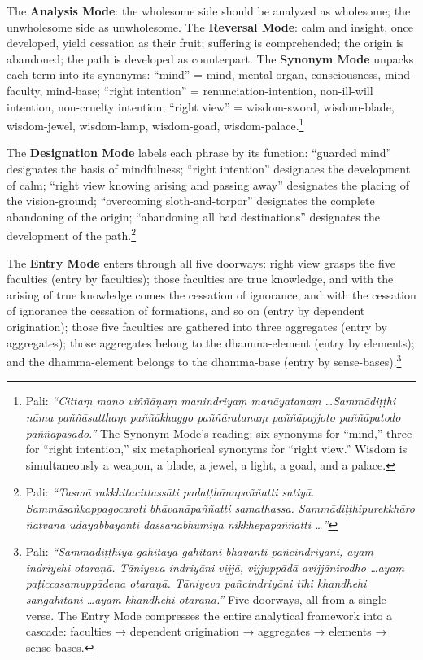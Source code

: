 The \textbf{Analysis Mode}: the wholesome side should be analyzed as wholesome; the unwholesome side as unwholesome. The \textbf{Reversal Mode}: calm and insight, once developed, yield cessation as their fruit; suffering is comprehended; the origin is abandoned; the path is developed as counterpart. The \textbf{Synonym Mode} unpacks each term into its synonyms: ``mind'' = mind, mental organ, consciousness, mind-faculty, mind-base; ``right intention'' = renunciation-intention, non-ill-will intention, non-cruelty intention; ``right view'' = wisdom-sword, wisdom-blade, wisdom-jewel, wisdom-lamp, wisdom-goad, wisdom-palace.\footnote{Pali: \textit{``Cittaṃ mano viññāṇaṃ manindriyaṃ manāyatanaṃ \ldots Sammādiṭṭhi nāma paññāsatthaṃ paññākhaggo paññāratanaṃ paññāpajjoto paññāpatodo paññāpāsādo.''} The Synonym Mode's reading: six synonyms for ``mind,'' three for ``right intention,'' six metaphorical synonyms for ``right view.'' Wisdom is simultaneously a weapon, a blade, a jewel, a light, a goad, and a palace.}

The \textbf{Designation Mode} labels each phrase by its function: ``guarded mind'' designates the basis of mindfulness; ``right intention'' designates the development of calm; ``right view knowing arising and passing away'' designates the placing of the vision-ground; ``overcoming sloth-and-torpor'' designates the complete abandoning of the origin; ``abandoning all bad destinations'' designates the development of the path.\footnote{Pali: \textit{``Tasmā rakkhitacittassāti padaṭṭhānapaññatti satiyā. Sammāsaṅkappagocaroti bhāvanāpaññatti samathassa. Sammādiṭṭhipurekkhāro ñatvāna udayabbayanti dassanabhūmiyā nikkhepapaññatti \ldots''}}

The \textbf{Entry Mode} enters through all five doorways: right view grasps the five faculties (entry by faculties); those faculties are true knowledge, and with the arising of true knowledge comes the cessation of ignorance, and with the cessation of ignorance the cessation of formations, and so on (entry by dependent origination); those five faculties are gathered into three aggregates (entry by aggregates); those aggregates belong to the dhamma-element (entry by elements); and the dhamma-element belongs to the dhamma-base (entry by sense-bases).\footnote{Pali: \textit{``Sammādiṭṭhiyā gahitāya gahitāni bhavanti pañcindriyāni, ayaṃ indriyehi otaraṇā. Tāniyeva indriyāni vijjā, vijjuppādā avijjānirodho \ldots ayaṃ paṭiccasamuppādena otaraṇā. Tāniyeva pañcindriyāni tīhi khandhehi saṅgahitāni \ldots ayaṃ khandhehi otaraṇā.''} Five doorways, all from a single verse. The Entry Mode compresses the entire analytical framework into a cascade: faculties → dependent origination → aggregates → elements → sense-bases.}

